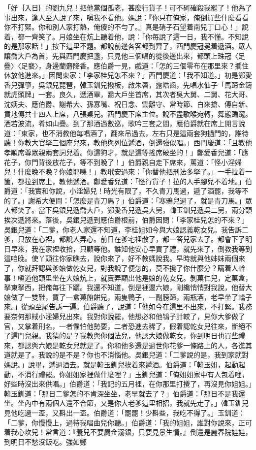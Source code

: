 \begin{showcontents}{}
「好｛入日｝的劉九兒！把他當個孤老，甚麼行貨子！可不砢磪殺我罷了！他為了事出來，逢人至人說了來，嗔我不看他。媽說：『你只在俺家，俺倒買些什麼看看你不打緊。你和別人家打熱，俺傻的不勻了。』真是硝子石望着南兒丁口心！」說着，都一齊笑了。月娘坐在炕上聽着他，說：「你每說了這一日，我不懂。不知說的是那家話！」按下這里不題。都說前邊各客都到齊了，西門慶冠冕着遞酒。眾人讓喬大戶為首，先與西門慶把盞，只見他三個唱的從後邊出來，都頭上珠冠〈足疊〉〈足褻〉，身邊蘭麝降香。應伯爵一見，戲道：「怎的三個零布在那里來？攔住休放他進來。」因問東家：「李家桂兒怎不來？」西門慶道：「我不知道。」初是鄭愛香兒彈箏，吳銀兒琵琶，韓玉釧兒撥板，啟朱唇，露皓齒，先唱水仙子「馬蹄金鑄就虎頭牌」一套。良久，遞酒畢，喬大戶坐首席，其次者吳大舅、二舅、花大哥、沈姨夫、應伯爵、謝希大、孫寡嘴、祝日念、雲離守、常時節、白來搶、傅自新、賁地傅共十四人上席，八張桌兒。西門慶下席主位。說不盡歌喉宛轉，舞態蹁躚。酒若波流，肴如山疊。到了那酒過數巡，歌吟三套之間，應伯爵就在席上開言說道：「東家，也不消教他每唱酒了，翻來吊過去，左右只是這兩套狗撾門的，誰待聽！你教大官拏三個座兒來，教他與列位遞酒，倒還強似唱。」西門慶道：「且教他孝順席尊眾親兩套詞兒着。你這狗才，就是這等搖席破坐的！」鄭愛香兒道：「應花子，你門背後放花子，等不到晚了！」伯爵親自走下席來，罵道：「怪小淫婦兒！什麼晚不晚？你娘耶嚛！」教玳安過來：「你替他把刑法多拏了。」一手拉着一箇，都拉到席上，教他遞酒。鄭愛香兒道：「怪行貨子！拉的人手腳兒不着地。」伯爵道：「我實和你說，小淫婦兒！時光有限了，不久青刀馬過，遞了酒罷，我等不的了。」謝希大便問：「怎麼是青刀馬？」伯爵道：「寒鴉兒過了，就是青刀馬。」眾人都笑了。當下吳銀兒遞喬大戶，鄭愛香兒遞吳大舅，韓玉釧兒遞吳二舅，兩分頭挨次遞將來。落後，吳銀兒遞到應伯爵根前，伯爵因問：「李家桂兒怎的不來？」吳銀兒道：「二爹，你老人家還不知道，李桂姐如今與大娘認義乾女兒。我告訴二爹，只放在心裡，都說人弄心。前日在爹宅裡散了，都一答兒家去了。都會下了明日早來，我在家裡收拾，只顧等他。誰知他安心早買了禮，就先來了，倒教我等到這咱晚。使丫頭往你家瞧去，說你來了，好不教媽說我。早時就與他姊妹兩個來了，你就拜認與爹娘做乾女兒，對我說了便怎的，莫不攙了你什麼分？瞞着人幹事！嗔道他頭里坐在大娘炕上，就賣弄顯出他是娘的乾女兒。剝菓仁兒，定菓盒，拏東拏西，把俺每往下躧。我還不知道，倒是裡邊六娘，剛纔悄悄對我說，他替大娘做了一雙鞋，買了一盒菓餡餅兒，兩隻鴨子，一副膀蹄，兩瓶酒，老早坐了轎子來。」從頭至尾告訴一遍。伯爵聽了，說道：「他如今在這里不出來，不打緊。我務要奈何那賊小淫婦兒出來。我對你說罷，他想必和他鴇子計較了，見你大爹做了官，又掌着刑名，一者懼怕他勢要，二者恐進去稀了，假着認乾女兒往來，斷絕不了這門兒親。我猜的是？我教與你個法兒，他認大娘做乾女，你到明日也買些禮來，都認與六娘是乾女兒就是了。你和他多還是過世你花爹一條路上的人，各進其道就是了。我說的是不是？你也不消惱他。吳銀兒道：「二爹說的是，我到家就對媽說。」說畢，遞過酒去。就是韓玉釧兒挨着來遞酒。伯爵道：「韓玉姐，起動起動，不消行禮罷。你姐姐家裡做什麼哩？」玉釧兒道：「俺姐姐家中有人包着哩，好些時沒出來供唱。」伯爵道：「我記的五月裡，在你那里打攪了，再沒見你姐姐。」韓玉釧道：「那日二爹怎的不肯深坐坐，老早就去了？」伯爵道：「那日不是我還坐。坐內中有兩個人還不合節，又是你大老爹這里相招，我就先走了。」韓玉釧兒見他吃過一盃，又斟出一盃。伯爵道：「罷罷！少斟些，我吃不得了。」玉釧道：「二爹，你慢慢上，過待我唱曲兒你聽。」伯爵道：「我的姐姐，誰對你說來，正可着我心坎兒！常言道：『養兒不要屙金溺銀，只要見景生情。』倒還是麗春院娃娃，到明日不愁沒飯吃。強如鄭
\end{showcontents}
